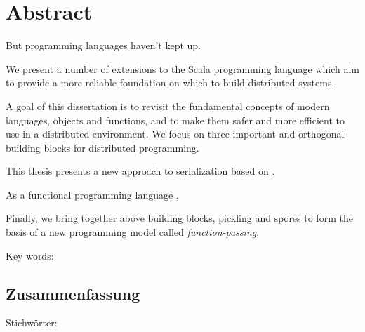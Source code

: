 

\cleardoublepage
\chapter*{Abstract}
But programming languages haven't kept up.

We present a number of extensions to the Scala programming language which aim to
provide a more reliable foundation on which to build distributed systems.


A goal of this dissertation is to revisit the fundamental concepts of modern
languages, objects and functions, and to make them safer and more efficient to
use in a distributed environment. We focus on three important and orthogonal
building blocks for distributed programming.

This thesis presents a new approach to serialization based on .

As a functional programming language ,



Finally, we bring together above building blocks, pickling and spores to form
the basis of a new programming model called {\em function-passing},

\lipsum[1-2]
\vskip0.5cm
Key words:


\begin{otherlanguage}{german}
\cleardoublepage
\chapter*{Zusammenfassung}
\lipsum[1-2]
\vskip0.5cm
Stichwörter:
\end{otherlanguage}



